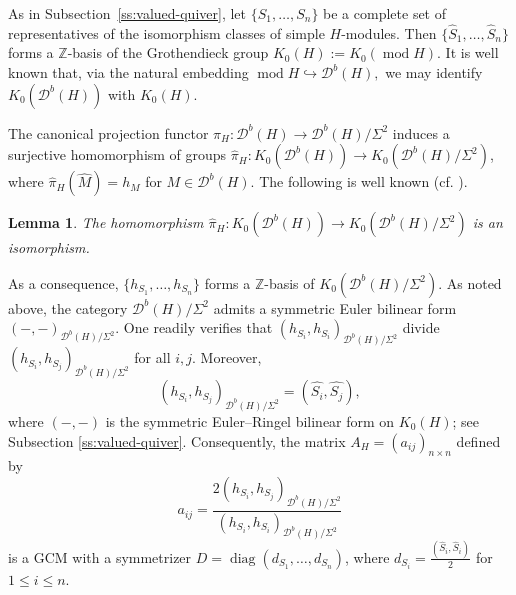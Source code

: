 \documentclass[12pt,reqno]{amsart}
\numberwithin{equation}{section}
\renewcommand{\mod}{\operatorname{mod}\nolimits}
\newcommand{\go}{{K_0}}
\newtheorem{lemma}[theorem]{Lemma}
\begin{document}
	As in Subsection~\ref{ss:valued-quiver}, let
	$\{S_1,\dots,S_n\}$ be a complete set of representatives of the isomorphism
	classes of simple $H$-modules. Then
	$\{\hat{S}_1,\dots,\hat{S}_n\}$
	forms a $\mathbb{Z}$-basis of the Grothendieck group $\go(H):=\go(\mod H)$.
	It is well known that, via the natural embedding
	$\mod H \hookrightarrow \mathcal{D}^b(H),$
	we may identify $\go(\mathcal{D}^b(H))$ with $\go(H)$.
	
	
	
	
	
	The canonical projection functor $\pi_H:\mathcal{D}^b(H)\rightarrow \mathcal{D}^b(H)/\Sigma^2$ induces a surjective homomorphism of groups $\hat{\pi}_H:\go(\mathcal{D}^b( H))\rightarrow \go(\mathcal{D}^b(H)/\Sigma^2)$, where $\hat{\pi}_H(\hat{M})=h_{M}$ for $M\in \mathcal{D}^b( H)$. The following is well known (cf. \cite[Proposition 2.11]{Fu12}).
	\begin{lemma}\label{lem:iso-groth-root-cat}
		The homomorphism $\hat{\pi}_H:\go(\mathcal{D}^b( H))\rightarrow \go(\mathcal{D}^b(H)/\Sigma^2)$ is an isomorphism.
	\end{lemma}
	
	As a consequence, $\{h_{S_1},\ldots, h_{S_n}\}$ forms a $\mathbb{Z}$-basis of $\go(\mathcal{D}^b(H)/\Sigma^2)$.
	As noted above, the category $\mathcal{D}^b(H)/\Sigma^2$ admits a symmetric Euler bilinear form $(-,-)_{\mathcal{D}^b(H)/\Sigma^2}$. One readily verifies that $(h_{S_i}, h_{S_i})_{\mathcal{D}^b(H)/\Sigma^2}$ divide $(h_{S_i}, h_{S_j})_{\mathcal{D}^b(H)/\Sigma^2}$ for all $i, j$. Moreover, \[(h_{S_i},h_{S_j})_{\mathcal{D}^b(H)/\Sigma^2}=(\hat{S_i},\hat{S_j}),\] where $(-,-)$ is the symmetric Euler--Ringel bilinear form on $\go( H)$; see Subsection \ref{ss:valued-quiver}.
	Consequently, the matrix $A_H = (a_{ij})_{n \times n}$ defined by
	\[a_{ij} = \frac{2(h_{S_i}, h_{S_j})_{\mathcal{D}^b(H)/\Sigma^2}}{(h_{S_i}, h_{S_i})_{\mathcal{D}^b(H)/\Sigma^2}}\]
	is a GCM with a symmetrizer $D=\operatorname{diag}(d_{S_1},\ldots, d_{S_n})$, where $d_{S_i}=\frac{(\hat{S}_i,\hat{S}_i)}{2}$ for $1\leq i\leq n$.
	
\end{document}
